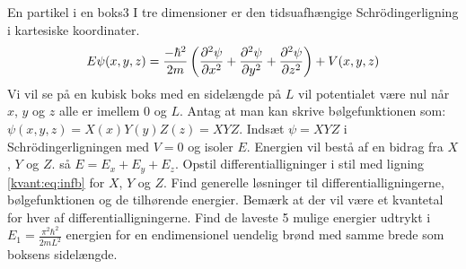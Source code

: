 \begin{opgave}{En partikel i en boks}{3}
I tre dimensioner er den tidsuafhængige Schrödingerligning i kartesiske koordinater.
$$
E\psi(x,y,z) = \frac{-\hbar^2}{2m}\left(\pdif[2]{x}\psi +\pdif[2]{y}\psi+\pdif[2]{z}\psi\right) + V(x,y,z)
$$
Vi vil se på en kubisk boks med en sidelængde på $L$ vil potentialet være nul når $x$, $y$ og $z$ alle er imellem 0 og $L$.
Antag at man kan skrive bølgefunktionen som: $\psi(x,y,z) = X(x)Y(y)Z(z) = XYZ$.
\opg Indsæt $\psi = XYZ$ i Schrödingerligningen med $V=0$ og isoler $E$.
\opg Energien vil bestå af en bidrag fra $X$, $Y$ og $Z$. så $E=E_x+E_y+E_z$. Opstil differentialligninger i stil med ligning \eqref{kvant:eq:infb} for $X$, $Y$ og $Z$.
\opg Find generelle løsninger til differentialligningerne, bølgefunktionen og de tilhørende energier. Bemærk at der vil være et kvantetal for hver af differentialligningerne. 
\opg Find de laveste 5 mulige energier udtrykt i $E_1 = \frac{\pi^2\hbar^2}{2mL^2}$ energien for en  endimensionel uendelig brønd med samme brede som boksens sidelængde.
\end{opgave}
